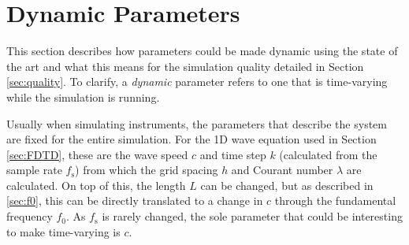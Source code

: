 \documentclass[dvipsnames, reprint]{JASA}
\begin{document}
\section{Dynamic Parameters}
This section describes how parameters could be made dynamic using the state of the art and what this means for the simulation quality detailed in Section \ref{sec:quality}. %
To clarify, a \textit{dynamic} parameter refers to one that is time-varying while the simulation is running. 


Usually when simulating instruments, the parameters that describe the system are fixed for the entire simulation. For the 1D wave equation used in Section \ref{sec:FDTD}, these are the wave speed $c$ and time step $k$ (calculated from the sample rate $f_\text{s}$) from which the grid spacing $h$ and Courant number $\lambda$ are calculated. On top of this, the length $L$ can be changed, but as described in \ref{sec:f0}, this can be directly translated to a change in $c$ through the fundamental frequency $f_0$. As $f_\text{s}$ is rarely changed, the sole parameter that could be interesting to make time-varying is $c$. 

%
%
\end{document}
